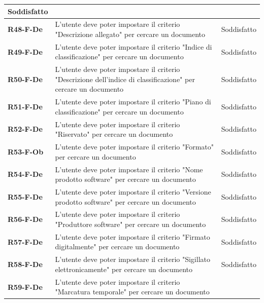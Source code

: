 \documentclass[a4paper,12pt]{article}
\begin{document}
{{{\begin{longtable}{|>{\centering\arraybackslash}m{}|>{\centering\arraybackslash}m{}|>{\centering\arraybackslash}m{}|}
                Soddisfatto \\ 
                \hline
                \textbf{R48-F-De} & L'utente deve poter impostare il criterio "Descrizione allegato" per cercare un documento & 
                Soddisfatto \\ 
                \hline
                \textbf{R49-F-De} & L'utente deve poter impostare il criterio "Indice di classificazione" per cercare un documento & 
                Soddisfatto \\ 
                \hline
                \textbf{R50-F-De} & L'utente deve poter impostare il criterio "Descrizione dell'indice di classificazione" per cercare un documento & 
                Soddisfatto \\ 
                \hline
                \textbf{R51-F-De} & L'utente deve poter impostare il criterio "Piano di classificazione" per cercare un documento & 
                Soddisfatto \\ 
                \hline
                \textbf{R52-F-De} & L'utente deve poter impostare il criterio "Riservato" per cercare un documento & 
                Soddisfatto \\ 
                \hline
                \textbf{R53-F-Ob} & L'utente deve poter impostare il criterio "Formato" per cercare un documento & 
                Soddisfatto \\ 
                \hline
                \textbf{R54-F-De} & L'utente deve poter impostare il criterio "Nome prodotto software" per cercare un documento & 
                Soddisfatto \\ 
                \hline
                \textbf{R55-F-De} & L'utente deve poter impostare il criterio "Versione prodotto software" per cercare un documento & 
                Soddisfatto \\ 
                \hline
                \textbf{R56-F-De} & L'utente deve poter impostare il criterio "Produttore software" per cercare un documento & 
                Soddisfatto \\ 
                \hline
                \textbf{R57-F-De} & L'utente deve poter impostare il criterio "Firmato digitalmente" per cercare un documento & 
                Soddisfatto \\ 
                \hline
                \textbf{R58-F-De} & L'utente deve poter impostare il criterio "Sigillato elettronicamente" per cercare un documento & 
                Soddisfatto \\ 
                \hline
                \textbf{R59-F-De} & L'utente deve poter impostare il criterio "Marcatura temporale" per cercare un documento & 

\end{longtable}}}}
\end{document}
